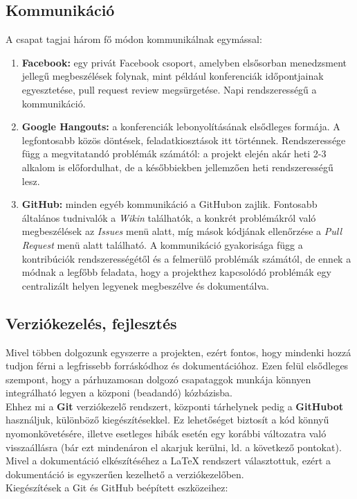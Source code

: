 \subsection{Kommunikáció}
A csapat tagjai három fő módon kommunikálnak egymással:
\begin{enumerate}
    \item \textbf{Facebook:} egy privát Facebook csoport, amelyben elsősorban menedzsment jellegű megbeszélések folynak, mint például konferenciák időpontjainak egyesztetése, pull request review megsürgetése. Napi rendszerességű a kommunikáció.
    \item \textbf{Google Hangouts:} a konferenciák lebonyolításának elsődleges formája. A legfontosabb közös döntések, feladatkiosztások itt történnek. Rendszeressége függ a megvitatandó problémák számától: a projekt elején akár heti 2-3 alkalom is előfordulhat, de a későbbiekben jellemzően heti rendszerességű lesz.
    \item \textbf{GitHub:} minden egyéb kommunikáció a GitHubon zajlik. Fontosabb általános tudnivalók a \textit{Wikin} találhatók, a konkrét problémákról való megbeszélések az \textit{Issues} menü alatt, míg mások kódjának ellenőrzése a \textit{Pull Request} menü alatt található. A kommunikáció gyakorisága függ a kontribúciók rendszerességétől és a felmerülő problémák számától, de ennek a módnak a legfőbb feladata, hogy a projekthez kapcsolódó problémák egy centralizált helyen legyenek
        megbeszélve és dokumentálva.
\end{enumerate}

\subsection{Verziókezelés, fejlesztés}
Mivel többen dolgozunk egyszerre a projekten, ezért fontos, hogy mindenki hozzá tudjon férni a legfrissebb forráskódhoz és dokumentációhoz. Ezen felül elsődleges szempont, hogy a párhuzamosan dolgozó csapataggok munkája könnyen integrálható legyen a közponi (beadandó) kózbázisba. \\ 
Ehhez mi a \textbf{Git} verziókezelő rendszert, központi tárhelynek pedig a \textbf{GitHubot}  használjuk, különböző kiegészítésekkel. Ez lehetőséget biztosít a kód könnyű nyomonkövetésére, illetve
esetleges hibák esetén egy korábbi változatra való visszaállásra (bár ezt mindenáron el akarjuk kerülni, ld. a következő pontokat). Mivel a dokumentáció elkészítéséhez a LaTeX rendszert választottuk, ezért a dokumentáció is egyszerűen kezelhető a verziókezelőben. \\
Kiegészítések a Git és GitHub beépített eszközeihez:

